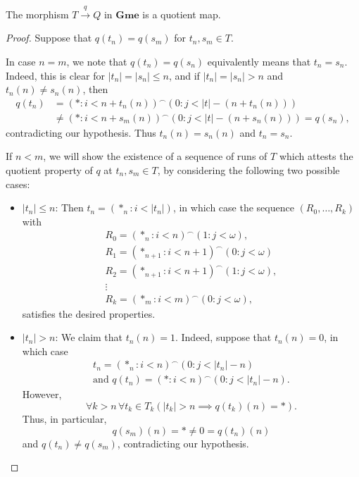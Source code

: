 \documentclass[10pt,a4paper]{amsart}
\newcommand{\Gmes}{\mathbf{Gme}}
\newcommand{\seq}[1]{{\left( {#1} \right)}}
\begin{document}
\begin{lemma}\label{LEMMA_q_regular}
	The morphism $T\stackrel{q}{\to}Q$ in $\Gmes$ is a quotient map.
\end{lemma}

\begin{proof}
	Suppose that $q(t_n)=q(s_m)$ for $t_n,s_m\in T$. 
	
	In case $n=m$, we note that $q(t_n)=q(s_n)$ equivalently means that $t_n=s_n$. Indeed, this is clear for $|t_n|=|s_n| \le n$, and if $|t_n|=|s_n| > n$ and $t_n(n) \neq s_n(n)$, then
	\begin{align*}
		q(t_n) &= \seq{\ast: i<n+t_n(n)}^\smallfrown\seq{0: j<|t|-(n+t_n(n))} \\
		&\neq \seq{\ast: i<n+s_m(n)}^\smallfrown\seq{0: j<|t|-(n+s_n(n))} = q(s_n),
	\end{align*}
	contradicting our hypothesis. Thus $t_n(n) = s_n(n)$ and $t_n = s_n$.
	
	If $n<m$, we will show the existence of a sequence of runs of $T$ which attests the quotient property of $q$ at $t_n,s_m\in T$, by considering the following two possible cases:
	\begin{itemize}
		\item $|t_n|\le n$: Then $t_n = \seq{\ast_n: i<|t_n|}$, in which case the sequence $\seq{R_0, \dotsc, R_k}$ with 
		\begin{gather*}
			R_0 = \seq{\ast_n: i<n}^\smallfrown\seq{1:j<\omega},\\
			R_1 = \seq{\ast_{n+1}: i<n+1}^\smallfrown\seq{0:j<\omega}\\
			R_2 = \seq{\ast_{n+1}: i<n+1}^\smallfrown\seq{1:j<\omega},\\
			\vdots\\
			R_k = \seq{\ast_{m}: i<m}^\smallfrown\seq{0:j<\omega},
		\end{gather*}
		satisfies the desired properties.
		
		\item $|t_n|> n$: We claim that $t_n(n) =  1$. Indeed, suppose that $t_n(n) = 0$, in which case 
		\begin{gather*}
			t_n = \seq{\ast_n: i<n}^\smallfrown \seq{0:j<|t_n|-n}\\
			\text{and } q(t_n) = \seq{\ast: i<n}^\smallfrown \seq{0:j<|t_n|-n}.
		\end{gather*}
		However, 
		\begin{equation}\label{EQ_Gme_Strong_not_Reg}
			\forall k>n \, \forall t_k\in T_k \left(|t_k|>n\implies q(t_k)(n)=\ast \right).
		\end{equation}
		Thus, in particular,
		\[
		q(s_m)(n)=\ast\neq 0 = q(t_n)(n)
		\] 
		and $q(t_n)\neq q(s_m)$, contradicting our hypothesis. 
		

\end{itemize}
\end{proof}
\end{document}
